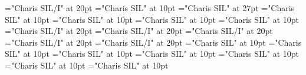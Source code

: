\documentclass[a4paper]{article}
\begin{document}
\pagestyle{plain}
\sloppy
\setlength{\parfillskip}{0pt plus 1fil}
\font\pronunciationenUKpronunciationbefore="Charis SIL/I" at 20pt
\font\sectionletterdictionary="Charis SIL" at 10pt
\font\headsectionletterdictionary="Charis SIL" at 27pt
\font\articledictionary="Charis SIL" at 10pt
\font\firstoftypeheadwordlastoftypearticledictionary="Charis SIL" at 10pt
\font\firstoftypegrammarrequireslastoftypearticledictionary="Charis SIL" at 10pt
\font\firstoftypelastoftyperelationsynonymarticledictionary="Charis SIL" at 10pt
\font\firstoftypepronunciationenUKarticledictionary="Charis SIL/I" at 20pt
\font\pronunciationenUKpronunciationbeforearticledictionary="Charis SIL/I" at 20pt
\font\lastoftypepronunciationenUSarticledictionary="Charis SIL/I" at 20pt
\font\pronunciationpronunciationbeforearticledictionary="Charis SIL/I" at 20pt
\font\lastoftypepronunciationenUKarticledictionary="Charis SIL/I" at 20pt
\font\firstoftypegrammarcategorylastoftypearticledictionary="Charis SIL" at 10pt
\font{}="Charis SIL" at 10pt
\font\firstoftypelastoftypenotearticledictionary="Charis SIL" at 10pt
\font\exampleusefirstoftypearticledictionary="Charis SIL" at 10pt
\font\examplefirstoftypearticledictionary="Charis SIL" at 10pt
\font\exampleuselastoftypearticledictionary="Charis SIL" at 10pt
\font\examplelastoftypearticledictionary="Charis SIL" at 10pt

\newpage 
\thispagestyle{empty} 
\mbox{} 
\newpage 
\newpage 
\setcounter{page}{1} 
\pagestyle{fancy} 
\begin{center}
\end{center}

\pronunciationpronunciationbeforearticledictionary{, }
\end{document}
